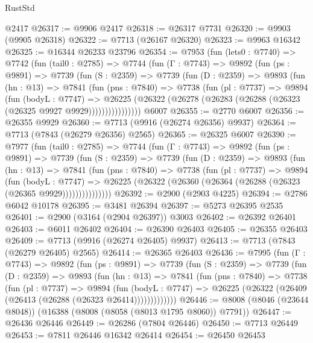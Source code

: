 \begin{lexlean}{RustStd}
\begin{coremodule}
    @2417
@26317 := @9906 @2417
@26318 := @26317 @7731
@26320 := @9903 (@9905 @26318)
@26322 := @7713 (@26167 @26320)
@26323 := @9963 @16342
@26325 := @16344 @26233 @23796
@26354 := @7953
    (fun (lets0 : @7740) =>
    @7742
      (fun (tail0 : @2785) =>
      @7744
        (fun (Γ : @7743) =>
        @9892
          (fun (ps : @9891) =>
          @7739
            (fun (S : @2359) =>
            @7739
              (fun (D : @2359) =>
              @9893
                (fun (hn : @13) =>
                @7841
                  (fun (pns : @7840) =>
                  @7738
                    (fun (pl : @7737) =>
                    @9894
                      (fun (bodyL : @7747) =>
                      @26225
                        (@26322 (@26278 (@26283 (@26288 (@26323 (@26325 @9927 @9929))))))))))))))))
    @6007
@26355 := @2770 @6007
@26356 := @26355 @9929
@26360 := @7713 (@9916 (@26274 @26356) @9937)
@26364 := @7713 (@7843 (@26279 @26356) @2565)
@26365 := @26325 @6007
@26390 := @7977
    (fun (tail0 : @2785) =>
    @7744
      (fun (Γ : @7743) =>
      @9892
        (fun (ps : @9891) =>
        @7739
          (fun (S : @2359) =>
          @7739
            (fun (D : @2359) =>
            @9893
              (fun (hn : @13) =>
              @7841
                (fun (pns : @7840) =>
                @7738
                  (fun (pl : @7737) =>
                  @9894
                    (fun (bodyL : @7747) =>
                    @26225 (@26322 (@26360 (@26364 (@26288 (@26323 (@26365 @9929)))))))))))))))
@26392 := @2900 (@2903 @4225)
@26394 := @2786 @6042 @10178
@26395 := @3481 @26394
@26397 := @5273 @26395 @2535
@26401 := @2900 (@3164 (@2904 @26397)) @3003
@26402 := @26392 @26401
@26403 := @6011 @26402
@26404 := @26390 @26403
@26405 := @26355 @26403
@26409 := @7713 (@9916 (@26274 @26405) @9937)
@26413 := @7713 (@7843 (@26279 @26405) @2565)
@26414 := @26365 @26403
@26436 := @7995
    (fun (Γ : @7743) =>
    @9892
      (fun (ps : @9891) =>
      @7739
        (fun (S : @2359) =>
        @7739
          (fun (D : @2359) =>
          @9893
            (fun (hn : @13) =>
            @7841
              (fun (pns : @7840) =>
              @7738
                (fun (pl : @7737) =>
                @9894
                  (fun (bodyL : @7747) =>
                  @26225 (@26322 (@26409 (@26413 (@26288 (@26323 @26414)))))))))))))
@26446 := @8008 (@8046 (@23644 @8048)) (@16388 (@8008 (@8058 (@8013 @1795 @8060)) @7791))
@26447 := @26436 @26446
@26449 := @26286 (@7804 @26446)
@26450 := @7713 @26449
@26453 := @7811 @26446 @16342 @26414
@26454 := @26450 @26453

\end{coremodule}
\end{lexlean}
